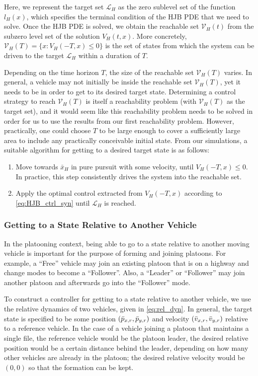 Here, we represent the target set $\mathcal{L}_H$ as the zero sublevel set of the function $l_H(x)$, which specifies the terminal condition of the HJB PDE that we need to solve. Once the HJB PDE is solved, we obtain the reachable set $\mathcal V_H(t)$ from the subzero level set of the solution $V_H(t,x)$. More concretely, $\mathcal{V}_H(T) = \{x: V_H(-T,x)\le 0\}$ is the set of states from which the system can be driven to the target $\mathcal{L}_H$ within a duration of $T$. 

Depending on the time horizon $T$, the size of the reachable set $\mathcal V_H(T)$ varies. In general, a vehicle may not initially be inside the reachable set $\mathcal V_H(T)$, yet it needs to be in order to get to its desired target state. Determining a control strategy to reach $\mathcal V_H(T)$ is itself a reachability problem (with $\mathcal V_H(T)$ as the target set), and it would seem like this reachability problem needs to be solved in order for us to use the results from our first reachability problem. However, practically, one could choose $T$ to be large enough to cover a sufficiently large area to include any practically conceivable initial state. From our simulations, a suitable algorithm for getting to a desired target state is as follows:

\begin{enumerate}
\item Move towards $\bar{x}_H$ in pure pursuit with some velocity, until $V_H(-T,x)\le 0$. In practice, this step consistently drives the system into the reachable set.
\item Apply the optimal control extracted from $V_H(-T,x)$ according to \eqref{eq:HJB_ctrl_syn} until $\mathcal{L}_H$ is reached.
\end{enumerate}

\subsubsection{Getting to a State Relative to Another Vehicle \label{sec:rel_target_ctrl}}
In the platooning context, being able to go to a state relative to another moving vehicle is important for the purpose of forming and joining platoons. For example, a ``Free'' vehicle may join an existing platoon that is on a highway and change modes to become a ``Follower''. Also, a ``Leader'' or ``Follower'' may join another platoon and afterwards go into the ``Follower'' mode.

To construct a controller for getting to a state relative to another vehicle, we use the relative dynamics of two vehicles, given in \eqref{eq:rel_dyn}. In general, the target state is specified to be some position $(\bar{p}_{x,r}, \bar{p}_{y,r})$ and velocity $(\bar{v}_{x,r}, \bar{v}_{y,r})$ relative to a reference vehicle. In the case of a vehicle joining a platoon that maintains a single file, the reference vehicle would be the platoon leader, the desired relative position would be a certain distance behind the leader, depending on how many other vehicles are already in the platoon; the desired relative velocity would be $(0,0)$ so that the formation can be kept.

